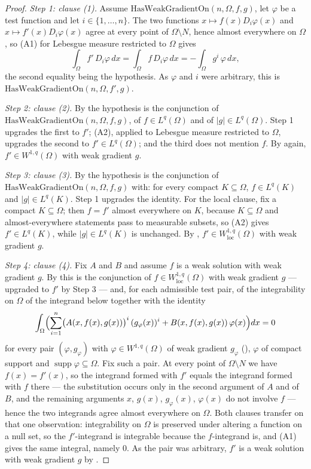 \begin{proof}
\emph{Step 1: clause (1).}  Assume $\mathrm{HasWeakGradientOn}(n,\Omega,f,g)$,
let $\varphi$ be a test function and let $i\in\{1,\dots,n\}$.  The two functions
$x\mapsto f(x)D_i\varphi(x)$ and $x\mapsto f'(x)D_i\varphi(x)$ agree at every
point of $\Omega\setminus N$, hence almost everywhere on $\Omega$, so (A1) for
Lebesgue measure restricted to $\Omega$ gives
\[
\int_\Omega f'\,D_i\varphi\,dx=\int_\Omega f\,D_i\varphi\,dx
=-\int_\Omega g^i\,\varphi\,dx ,
\]
the second equality being the hypothesis.  As $\varphi$ and $i$ were arbitrary,
this is $\mathrm{HasWeakGradientOn}(n,\Omega,f',g)$.

\emph{Step 2: clause (2).}  By  the hypothesis is the
conjunction of $\mathrm{HasWeakGradientOn}(n,\Omega,f,g)$, of
$f\in L^q(\Omega)$ and of $|g|\in L^q(\Omega)$.  Step 1 upgrades the first to
$f'$; (A2), applied to Lebesgue measure restricted to $\Omega$, upgrades the
second to $f'\in L^q(\Omega)$; and the third does not mention $f$.  By
 again, $f'\in W^{1,q}(\Omega)$ with weak gradient $g$.

\emph{Step 3: clause (3).}  By  the hypothesis is the
conjunction of $\mathrm{HasWeakGradientOn}(n,\Omega,f,g)$ with: for every
compact $K\subseteq\Omega$, $f\in L^q(K)$ and $|g|\in L^q(K)$.  Step 1 upgrades
the identity.  For the local clause, fix a compact $K\subseteq\Omega$; then
$f=f'$ almost everywhere on $K$, because $K\subseteq\Omega$ and
almost-everywhere statements pass to measurable subsets, so (A2) gives
$f'\in L^q(K)$, while $|g|\in L^q(K)$ is unchanged.  By ,
$f'\in W^{1,q}_{\mathrm{loc}}(\Omega)$ with weak gradient $g$.

\emph{Step 4: clause (4).}  Fix $A$ and $B$ and assume $f$ is a weak solution
with weak gradient $g$.  By  this is the conjunction of
$f\in W^{1,q}_{\mathrm{loc}}(\Omega)$ with weak gradient $g$ --- upgraded to
$f'$ by Step 3 --- and, for each admissible test pair, of the integrability on
$\Omega$ of the integrand below together with the identity
\[
\int_\Omega\Bigl(\sum_{i=1}^n\bigl(A(x,f(x),g(x))\bigr)^i\,(g_\varphi(x))^i
+B(x,f(x),g(x))\,\varphi(x)\Bigr)dx=0
\]
for every pair $(\varphi,g_\varphi)$ with $\varphi\in W^{1,q}(\Omega)$ of weak
gradient $g_\varphi$ (), $\varphi$ of compact support and
$\operatorname{supp}\varphi\subseteq\Omega$.  Fix such a pair.  At every point
of $\Omega\setminus N$ we have $f(x)=f'(x)$, so the integrand formed with $f'$
equals the integrand formed with $f$ there --- the substitution occurs only in
the second argument of $A$ and of $B$, and the remaining arguments $x$, $g(x)$,
$g_\varphi(x)$, $\varphi(x)$ do not involve $f$ --- hence the two integrands
agree almost everywhere on $\Omega$.  Both clauses transfer on that one
observation: integrability on $\Omega$ is preserved under altering a function on
a null set, so the $f'$-integrand is integrable because the $f$-integrand is,
and (A1) gives the same integral, namely $0$.  As the pair was arbitrary, $f'$
is a weak solution with weak gradient $g$ by .


\end{proof}
